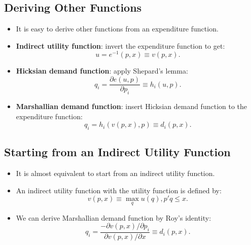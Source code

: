 \documentclass[
]{book}
\providecommand{\tightlist}{%
  \setlength{\itemsep}{0pt}\setlength{\parskip}{0pt}}
\begin{document}
\hypertarget{deriving-other-functions}{%
\subsection{Deriving Other Functions}\label{deriving-other-functions}}

\begin{itemize}
\tightlist
\item
  It is easy to derive other functions from an expenditure function.
\item
  \textbf{Indirect utility function}: invert the expenditure function to get:
  \begin{equation}
  u = e^{-1}(p, x) \equiv v(p, x).
  \end{equation}
\item
  \textbf{Hicksian demand function}: apply Shepard's lemma:
  \begin{equation}
  q_i = \frac{\partial e(u, p)}{\partial p_i} \equiv h_i(u, p).
  \end{equation}
\item
  \textbf{Marshallian demand function}: insert Hicksian demand function to the expenditure function:
  \begin{equation}
  q_i = h_i(v(p, x), p) \equiv d_i(p, x).
  \end{equation}
\end{itemize}

\hypertarget{starting-from-an-indirect-utility-function}{%
\subsection{Starting from an Indirect Utility Function}\label{starting-from-an-indirect-utility-function}}

\begin{itemize}
\tightlist
\item
  It is almost equivalent to start from an indirect utility function.
\item
  An indirect utility function with the utility function is defined by:
  \begin{equation}
  v(p, x) \equiv \max_{q} u(q), p'q \le x.
  \end{equation}
\item
  We can derive Marshallian demand function by Roy's identity:
  \begin{equation}
  q_i = \frac{- \partial v(p, x)/\partial p_i}{\partial v(p, x)/\partial x} \equiv d_i(p, x).
  \end{equation}
\end{itemize}
\end{document}
